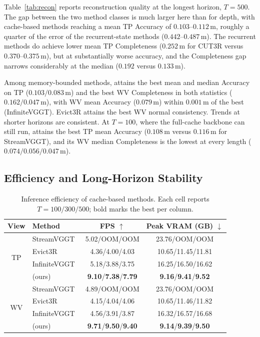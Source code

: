 Table~\ref{tab:recon} reports reconstruction quality at the longest horizon, $T{=}500$. The gap between the two method classes is much larger here than for depth, with cache-based methods reaching a mean TP Accuracy of $0.103$--$0.112$\,m, roughly a quarter of the error of the recurrent-state methods ($0.442$--$0.487$\,m). The recurrent methods do achieve lower mean TP Completeness ($0.252$\,m for CUT3R versus $0.370$--$0.375$\,m), but at substantially worse accuracy, and the Completeness gap narrows considerably at the median ($0.192$ versus $0.133$\,m).

Among memory-bounded methods, \method{} attains the best mean and median Accuracy on TP ($0.103/0.083$\,m) and the best WV Completeness in both statistics ($0.162/0.047$\,m), with WV mean Accuracy ($0.079$\,m) within $0.001$\,m of the best (InfiniteVGGT). Evict3R attains the best WV normal consistency. Trends at shorter horizons are consistent. At $T{=}100$, where the full-cache backbone can still run, \method{} attains the best TP mean Accuracy ($0.108$\,m versus $0.116$\,m for StreamVGGT), and its WV median Completeness is the lowest at every length ($0.074/0.056/0.047$\,m).

\subsection{Efficiency and Long-Horizon Stability}
\label{sec:exp-efficiency}

\begin{table}[t]
    \centering
    \caption{Inference efficiency of cache-based methods. Each cell reports $T{=}100/300/500$; bold marks the best per column.}
    \label{tab:efficiency}
    \tabletext
    \setlength{\tabcolsep}{3pt}
    \begin{tabular}{clcc}
        \toprule
        View & Method & FPS $\uparrow$ & Peak VRAM (GB) $\downarrow$ \\
        \midrule
        \multirow{4}{*}{TP}
        & StreamVGGT~\cite{zhuo2025streamvggt}     & 5.02/OOM/OOM   & 23.76/OOM/OOM \\
        & Evict3R~\cite{mahdi2025evict3r}          & 4.36/4.00/4.03 & 10.65/11.45/11.81 \\
        & InfiniteVGGT~\cite{yuan2026infinitevggt} & 5.18/3.88/3.75 & 16.25/16.50/16.62 \\
        & \method{} (ours)                         & \textbf{9.10}/\textbf{7.38}/\textbf{7.79} & \textbf{9.16}/\textbf{9.41}/\textbf{9.52} \\
        \midrule
        \multirow{4}{*}{WV}
        & StreamVGGT~\cite{zhuo2025streamvggt}     & 4.89/OOM/OOM   & 23.76/OOM/OOM \\
        & Evict3R~\cite{mahdi2025evict3r}          & 4.15/4.04/4.06 & 10.65/11.46/11.82 \\
        & InfiniteVGGT~\cite{yuan2026infinitevggt} & 4.56/3.91/3.87 & 16.32/16.57/16.68 \\
        & \method{} (ours)                         & \textbf{9.71}/\textbf{9.50}/\textbf{9.40} & \textbf{9.14}/\textbf{9.39}/\textbf{9.50} \\
        \bottomrule
    \end{tabular}
\end{table}

